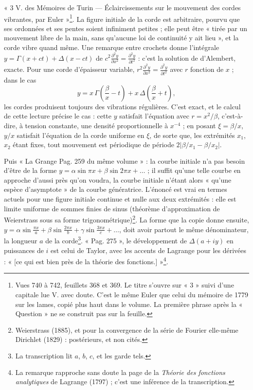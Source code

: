\documentclass[11pt,a4paper]{article}
\begin{document}
« 3 V. des Mémoires de Turin --- Éclaircissements sur le mouvement des cordes vibrantes, par Euler »\footnote{Vues 740 à 742, feuillets 368 et 369. Le titre s'ouvre sur « 3 » suivi d'une capitale lue V. avec doute. C'est le même Euler que celui du mémoire de 1779 sur les lames, copié plus haut dans le volume. La première phrase après la « Question » ne se construit pas sur la feuille.}. La figure initiale de la corde est arbitraire, pourvu que ses ordonnées et ses pentes soient infiniment petites ; elle peut être « tirée par un mouvement libre de la main, sans qu'aucune loi de continuité y ait lieu », et la corde vibre quand même. Une remarque entre crochets donne l'intégrale $y=\Gamma(x+ct)+\Delta(x-ct)$ de $c^2\frac{\partial^2y}{\partial x^2}=\frac{\partial^2y}{\partial t^2}$ : c'est la solution de d'Alembert, exacte. Pour une corde d'épaisseur variable, $r^2\frac{\partial^2y}{\partial x^2}=\frac{\partial^2y}{\partial t^2}$ avec $r$ fonction de $x$ ; dans le cas
\[ y=x\,\Gamma\!\left(\frac\beta x-t\right)+x\,\Delta\!\left(\frac\beta x+t\right), \]
les cordes produisent toujours des vibrations régulières. C'est exact, et le calcul de cette lecture précise le cas : cette $y$ satisfait l'équation avec $r=x^2/\beta$, c'est-à-dire, à tension constante, une densité proportionnelle à $x^{-4}$ ; en posant $\xi=\beta/x$, $y/x$ satisfait l'équation de la corde uniforme en $\xi$, de sorte que, les extrémités $x_1$, $x_2$ étant fixes, tout mouvement est périodique de période $2|\beta/x_1-\beta/x_2|$.

Puis « La Grange Pag. 259 du même volume » : la courbe initiale n'a pas besoin d'être de la forme $y=\alpha\sin\pi x+\beta\sin2\pi x+\dots$ ; il suffit qu'une telle courbe en approche d'aussi près qu'on voudra, la courbe initiale n'étant alors « qu'une espèce d'asymptote » de la courbe génératrice. L'énoncé est vrai en termes actuels pour une figure initiale continue et nulle aux deux extrémités : elle est limite uniforme de sommes finies de sinus (théorème d'approximation de Weierstrass sous sa forme trigonométrique)\footnote{Weierstrass (1885), et pour la convergence de la série de Fourier elle-même Dirichlet (1829) : postérieurs, et non cités.}. La forme que la copie donne ensuite, $y=\alpha\sin\frac{\pi x}{a}+\beta\sin\frac{2\pi x}{b}+\gamma\sin\frac{3\pi x}{c}+\dots$, doit avoir partout le même dénominateur, la longueur $a$ de la corde\footnote{La transcription lit $a$, $b$, $c$, et les garde tels.}. « Pag. 275 », le développement de $\Delta(a+iy)$ en puissances de $i$ est celui de Taylor, avec les accents de Lagrange pour les dérivées : « [ce qui est bien près de la théorie des fonctions.] »\footnote{La remarque rapproche sans doute la page de la \emph{Théorie des fonctions analytiques} de Lagrange (1797) ; c'est une inférence de la transcription.}.
\end{document}
